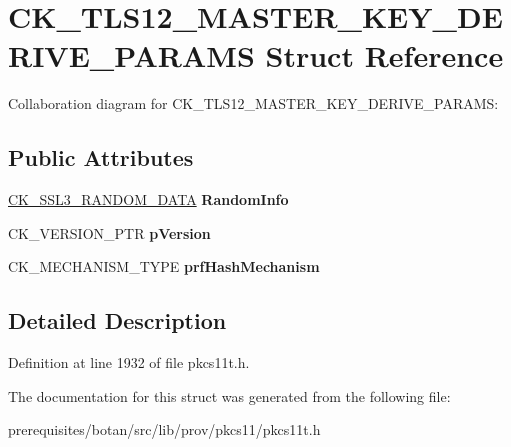 \hypertarget{struct_c_k___t_l_s12___m_a_s_t_e_r___k_e_y___d_e_r_i_v_e___p_a_r_a_m_s}{}\section{C\+K\+\_\+\+T\+L\+S12\+\_\+\+M\+A\+S\+T\+E\+R\+\_\+\+K\+E\+Y\+\_\+\+D\+E\+R\+I\+V\+E\+\_\+\+P\+A\+R\+A\+MS Struct Reference}
\label{struct_c_k___t_l_s12___m_a_s_t_e_r___k_e_y___d_e_r_i_v_e___p_a_r_a_m_s}


Collaboration diagram for C\+K\+\_\+\+T\+L\+S12\+\_\+\+M\+A\+S\+T\+E\+R\+\_\+\+K\+E\+Y\+\_\+\+D\+E\+R\+I\+V\+E\+\_\+\+P\+A\+R\+A\+MS\+:
\subsection*{Public Attributes}
\begin{DoxyCompactItemize}
\item 
\mbox{\label{struct_c_k___t_l_s12___m_a_s_t_e_r___k_e_y___d_e_r_i_v_e___p_a_r_a_m_s_ae97101511e1c04224a1bfbf2e92bfb95}} 
\mbox{\hyperlink{struct_c_k___s_s_l3___r_a_n_d_o_m___d_a_t_a}{C\+K\+\_\+\+S\+S\+L3\+\_\+\+R\+A\+N\+D\+O\+M\+\_\+\+D\+A\+TA}} {\bfseries Random\+Info}
\item 
\mbox{\label{struct_c_k___t_l_s12___m_a_s_t_e_r___k_e_y___d_e_r_i_v_e___p_a_r_a_m_s_a809b03bb337fc79492709421a1d0f280}} 
C\+K\+\_\+\+V\+E\+R\+S\+I\+O\+N\+\_\+\+P\+TR {\bfseries p\+Version}
\item 
\mbox{\label{struct_c_k___t_l_s12___m_a_s_t_e_r___k_e_y___d_e_r_i_v_e___p_a_r_a_m_s_a6c5f467ddb3f3b70be75e087181e8d90}} 
C\+K\+\_\+\+M\+E\+C\+H\+A\+N\+I\+S\+M\+\_\+\+T\+Y\+PE {\bfseries prf\+Hash\+Mechanism}
\end{DoxyCompactItemize}


\subsection{Detailed Description}


Definition at line 1932 of file pkcs11t.\+h.



The documentation for this struct was generated from the following file\+:\begin{DoxyCompactItemize}
\item 
prerequisites/botan/src/lib/prov/pkcs11/pkcs11t.\+h\end{DoxyCompactItemize}
